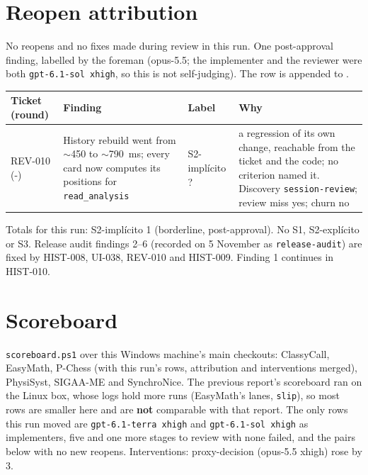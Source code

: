 \documentclass[11pt,a4paper]{article}
\begin{document}
\section*{Reopen attribution}

No reopens and no fixes made during review in this run. One post-approval finding, labelled by
the foreman (opus-5.5; the implementer and the reviewer were both \texttt{gpt-6.1-sol xhigh}, so
this is not self-judging). The row is appended to .

{\small\noindent
\begin{tabularx}{\linewidth}{@{}>{\raggedright\arraybackslash}p{1.7cm}X>{\raggedright\arraybackslash}p{2.3cm}X@{}}
\toprule
Ticket (round) & Finding & Label & Why \\
\midrule
REV-010 (-) & History rebuild went from $\sim$450 to $\sim$790~ms; every card now computes its positions for \texttt{read\_analysis} & S2-implícito ? & a regression of its own change, reachable from the ticket and the code; no criterion named it. Discovery \texttt{session-review}; review miss yes; churn no \\
\bottomrule
\end{tabularx}
}

Totals for this run: S2-implícito 1 (borderline, post-approval). No S1, S2-explícito or S3. Release
audit findings 2--6 (recorded on 5 November as \texttt{release-audit}) are fixed by HIST-008,
UI-038, REV-010 and HIST-009. Finding 1 continues in HIST-010.

\section*{Scoreboard}

\texttt{scoreboard.ps1} over this Windows machine's main checkouts: ClassyCall, EasyMath, P-Chess
(with this run's rows, attribution and interventions merged), PhysiSyst, SIGAA-ME and SynchroNice.
The previous report's scoreboard ran on the Linux box, whose logs hold more runs (EasyMath's lanes,
\texttt{slip}), so most rows are smaller here and are \textbf{not} comparable with that report. The
only rows this run moved are \texttt{gpt-6.1-terra xhigh} and \texttt{gpt-6.1-sol xhigh} as
implementers, five and one more stages to review with none failed, and the pairs below with no new
reopens. Interventions: proxy-decision (opus-5.5 xhigh) rose by 3.
\end{document}
